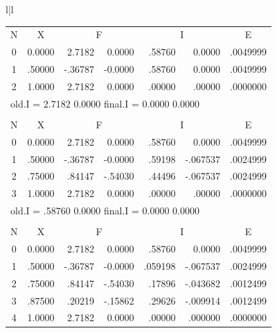 \begin{figure}[H]
    \centering
    \tiny
    \setlength{\tabcolsep}{.4em}
    \begin{tabular}{l|l}
        \begin{tabular}{ccrrrrr}
            \multicolumn{1}{c}{N} & \multicolumn{1}{c}{X} &
            \multicolumn{2}{c}{F} & \multicolumn{2}{c}{I} &
            \multicolumn{1}{c}{E} \\
            0 & 0.0000 & 2.7182  &  0.0000 & .58760 & 0.0000 & .0049999 \\
            1 & .50000 & -.36787 & -0.0000 & .58760 & 0.0000 & .0049999 \\
            2 & 1.0000 & 2.7182  &  0.0000 & .00000 & .00000 & .0000000 \\
            \multicolumn{7}{l}{old.I = 2.7182 0.0000 \hfill final.I = 0.0000 0.0000} \\
        \\
            \multicolumn{1}{c}{N} & \multicolumn{1}{c}{X} &
            \multicolumn{2}{c}{F} & \multicolumn{2}{c}{I} &
            \multicolumn{1}{c}{E} \\
            0 & 0.0000 & 2.7182  &  0.0000 & .58760 & 0.0000   & .0049999 \\
            1 & .50000 & -.36787 & -0.0000 & .59198 & -.067537 & .0024999 \\
            2 & .75000 & .84147  & -.54030 & .44496 & -.067537 & .0024999 \\
            3 & 1.0000 & 2.7182  &  0.0000 & .00000 & .00000   & .0000000 \\
            \multicolumn{7}{l}{old.I = .58760 0.0000 \hfill final.I = 0.0000 0.0000} \\
        \\
            \multicolumn{1}{c}{N} & \multicolumn{1}{c}{X} &
            \multicolumn{2}{c}{F} & \multicolumn{2}{c}{I} &
            \multicolumn{1}{c}{E} \\
            0 & 0.0000 & 2.7182  &  0.0000 & .58760  & 0.0000   & .0049999 \\
            1 & .50000 & -.36787 & -0.0000 & .059198 & -.067537 & .0024999 \\
            2 & .75000 & .84147  & -.54030 & .17896  & -.043682 & .0012499 \\
            3 & .87500 & .20219  & -.15862 & .29626  & -.009914 & .0012499 \\
            4 & 1.0000 & 2.7182  & 0.0000  & .00000  &  .000000 & .0000000 \\

\end{tabular}
\end{tabular}
\end{figure}
